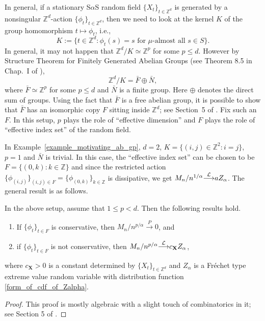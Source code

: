 \documentclass[12pt]{amsart}
\begin{document}
In general, if a stationary S$\alpha$S random field ${\{X_t\}_{t \in \mathbb{Z}^d}}$ is generated by a nonsingular ${\mathbb{Z}^d}$-action ${\{\phi_t\}_{t \in \mathbb{Z}^d}}$, then we need to look at the kernel $K$ of the group homomorphism $t \mapsto \phi_t$, i.e.,
$$
K:=\{t \in {\mathbb{Z}^d}: \phi_t (s) = s \mbox{ for $\mu$-almost all }s \in S\}.
$$
In general, it may not happen that ${\mathbb{Z}^d}/K \simeq \mathbb{Z}^p$ for some $p \leq d$. However by Structure Theorem for Finitely Generated Abelian Groups (see Theorem 8.5 in Chap.~I of \cite{lang:2002}),
\[
{\mathbb{Z}^d}/K = \bar{F} \oplus \bar{N},
\]
where $\bar{F} \simeq \mathbb{Z}^p$ for some $p \leq d$ and $\bar{N}$ is a finite group. Here $\oplus$ denotes the direct sum of groups. Using the fact that $\bar{F}$ is a free abelian group, it is possible to show that $\bar{F}$ has an isomorphic copy $F$ sitting inside ${\mathbb{Z}^d}$; see Section~5 of \cite{roy:samorodnitsky:2008}. Fix such an $F$. In this setup, $p$ plays the role of ``effective dimension'' and $F$ plays the role of ``effective index set'' of the random field.

In Example~\ref{example_motivating_ab_gp}, $d=2$, $K=\{(i,j) \in \mathbb{Z}^2: i=j\}$, $p=1$ and $\bar{N}$ is trivial. In this case, the ``effective index set'' can be chosen to be $F=\{(0,k): k \in \mathbb{Z}\}$ and since the restricted action $\{\phi_{(i,j)}\}_{(i,j) \in F} = \{\phi_{(0,k)}\}_{k \in \mathbb{Z}}$ is dissipative, we get $M_n/n^{1/\alpha} {\stackrel{\footnotesize{\mathcal{L}}}{\longrightarrow}} a Z_\alpha$. The general result is as follows.

\begin{thm} \label{thm_M_n_ab_gp} In the above setup, assume that $1 \leq p <d$. Then the following results hold.
\begin{enumerate}
\item If $\{\phi_t\}_{t \in F}$ is conservative, then $M_n / n^{p/\alpha} {\stackrel{P}{\longrightarrow}} 0$, and
\item if $\{\phi_t\}_{t \in F}$ is not conservative, then $M_n / n^{p/\alpha} {\stackrel{\footnotesize{\mathcal{L}}}{\longrightarrow}} c_{\mathbf{X}} Z_\alpha$,
\end{enumerate}
where $c_{\mathbf{X}} >0$ is a constant determined by ${\{X_t\}_{t \in \mathbb{Z}^d}}$ and $Z_\alpha$ is a Fr\'{e}chet type extreme value random variable with distribution function \eqref{form_of_cdf_of_Zalpha}.
\end{thm}

\begin{proof} This proof is mostly algebraic with a slight touch of combinatorics in it; see Section 5 of \cite{roy:samorodnitsky:2008}.
\end{proof}
\end{document}

